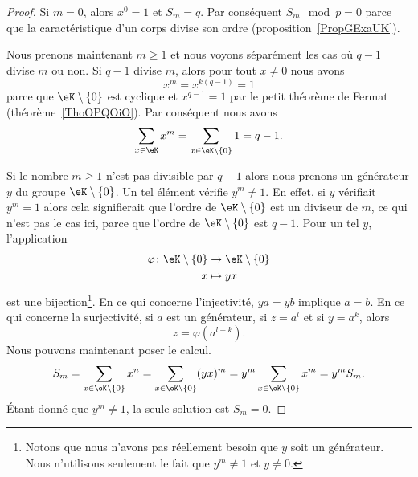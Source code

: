 \begin{proof}
	Si \( m=0\), alors \( x^0=1\) et \( S_m=q\). Par conséquent \( S_m\mod p=0\) parce que la caractéristique d'un corps divise son ordre (proposition~\ref{PropGExaUK}).

	Nous prenons maintenant \( m\geq 1\) et nous voyons séparément les cas où \( q-1\) divise \( m\) ou non. Si \( q-1\) divise \( m\), alors pour tout \( x\neq 0\) nous avons
	\begin{equation}
		x^m=x^{k(q-1)}=1
	\end{equation}
	parce que \( \eK\setminus\{ 0 \}\) est cyclique et \( x^{q-1}=1\) par le petit théorème de Fermat (théorème~\ref{ThoOPQOiO}). Par conséquent nous avons
	\begin{equation}
		\sum_{x\in \eK}x^m=\sum_{x\in \eK\setminus\{ 0 \}}1=q-1.
	\end{equation}

	Si le nombre \( m\geq 1\) n'est pas divisible par \( q-1\) alors nous prenons un générateur \( y\) du groupe \( \eK\setminus\{ 0 \}\). Un tel élément vérifie \( y^m\neq 1\). En effet, si \( y\) vérifiait \( y^m=1\) alors cela signifierait que l'ordre de \( \eK\setminus\{ 0 \}\) est un diviseur de \( m\), ce qui n'est pas le cas ici, parce que l'ordre de \( \eK\setminus\{ 0 \}\) est \( q-1\). Pour un tel \( y\), l'application
	\begin{equation}
		\begin{aligned}
			\varphi\colon \eK\setminus\{ 0 \} & \to \eK\setminus\{ 0 \}         \\
			               x                  & \mapsto yx
		\end{aligned}
	\end{equation}
	est une bijection\footnote{Notons que nous n'avons pas réellement besoin que \( y\) soit un générateur. Nous n'utilisons seulement le fait que \( y^m\neq 1\) et \( y\neq 0\).}. En ce qui concerne l'injectivité, \( ya=yb\) implique \( a=b\). En ce qui concerne la surjectivité, si \( a\) est un générateur, si \( z=a^l\) et si \( y=a^k\), alors
	\begin{equation}
		z=\varphi(a^{l-k}).
	\end{equation}
	Nous pouvons maintenant poser le calcul.
	\begin{equation}
		S_m=\sum_{x\in \eK\setminus\{ 0 \}}x^n=\sum_{x\in \eK\setminus\{ 0 \}}(yx)^m=y^m\sum_{x\in \eK\setminus\{ 0 \}}x^m=y^mS_m.
	\end{equation}
	Étant donné que \( y^m\neq 1\), la seule solution est \( S_m=0\).
\end{proof}

